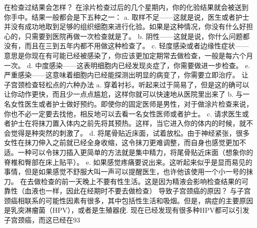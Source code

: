 \documentclass[12pt,UTF8,openany]{ctexbook}
\begin{document}
在检查过结果会怎样？
在涂片检查过后的几个星期内，你的化验结果就会被送到你手中。结果一般都会是下五种之一：
a. 取样不足——这就是说，医生或者护士并没有成功地取到足够的组织细胞来进行化验。如果是这种情况，你没有什么好担心的，只需要到医院再做一次检查就是了。
b. 阴性——这就是说，你什么问题都没有，而且在三到五年内都不用做这种检查了。
c. 轻度感染或者边缘性症状——意思是你现在有可能已经被感染了，你应该更加定期常去做检查，一般是每六个月一次。
d. 中度感染——这表明细胞内已经发现炎症了，你需要做进一步检查。
e. 严重感染——这意味着细胞内已经能探测出明显的病变了，你需要立即治疗。
让子宫颈检查轻松点的六种办法
a. 穿着衬衫。听起来过于简易了，但是这的确可以让你动作更快，而且少一点点尴尬，这样你就可以快速地从医院里出来了
b. 与一名女性医生或者护士做好预约。即使你的固定医师是男性，对于做涂片检查来说，你也不必一定要去找他，相反地可以去看一名女性医师或者护士。
c. 请求医生或者护士在将抹刀置入体内之前先将其预热。这样，当它进入你的体内的时候，就不会觉得是种突然的刺激了。
d. 将尾骨贴近床面，试着放松。由于神经紧张，很多女性在抹刀伸入之前就已经全身收缩，这令抹刀更难调整，而自身也感觉更加不适。一种可以令抹刀插入更简单的方法就是集中精力，将尾骨贴近床面（想象你的脊椎和臀部在床上贴平）。
e. 如果感觉疼痛要说出来。这听起来似乎是显而易见的事情，但是如果感觉不舒服大叫一声可以提醒医生，也许他该使用一个小一号的抹刀。
在去做检查的前一天晚上不要有性生活。这是因为精液会影响检查结果的可靠性（血液也一样，因此在经期时不要去做检查）
导致子宫颈癌的原因？
与子宫颈癌相联系的可能性因素有很多，其中包括性生活和吸烟。但是，病症的主要原因是乳突淋瘤菌（HPV），或者是生殖器疣. 现在已经发现有很多种HPV都可以引发子宫颈癌，而这已经在93%
\end{document}
